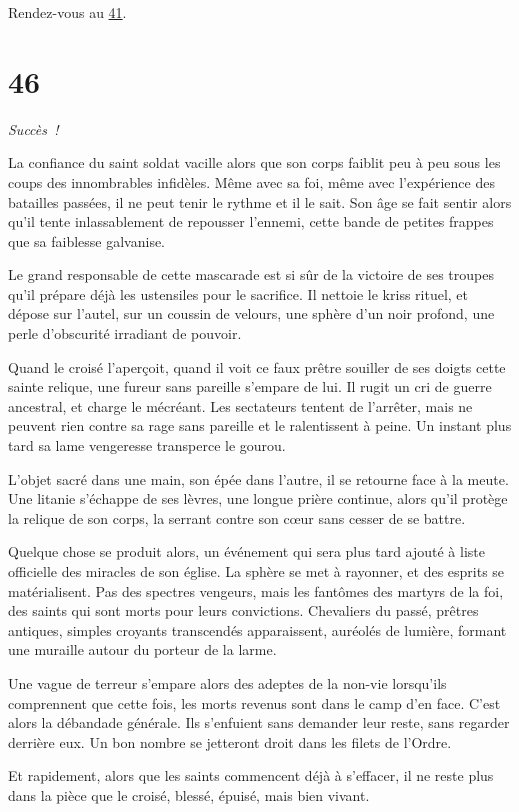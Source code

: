 \documentclass{report}
\newcommand{\gsection}[1]{
    \section{#1}
    \label{section-#1}
}
\newcommand{\glink}[1]{\hyperref[section-#1]{#1}}
\newcommand{\success}{\emph{Succès !}}
\begin{document}
Rendez-vous au \glink{41}.

\gsection{46}

\success

La confiance du saint soldat vacille alors que son corps faiblit peu à peu sous les coups des innombrables infidèles. Même avec sa foi, même avec l'expérience des batailles passées, il ne peut tenir le rythme et il le sait. Son âge se fait sentir alors qu'il tente inlassablement de repousser l'ennemi, cette bande de petites frappes que sa faiblesse galvanise.

Le grand responsable de cette mascarade est si sûr de la victoire de ses troupes qu'il prépare déjà les ustensiles pour le sacrifice. Il nettoie le kriss rituel, et dépose sur l'autel, sur un coussin de velours, une sphère d'un noir profond, une perle d'obscurité irradiant de pouvoir.

Quand le croisé l'aperçoit, quand il voit ce faux prêtre souiller de ses doigts cette sainte relique, une fureur sans pareille s'empare de lui. Il rugit un cri de guerre ancestral, et charge le mécréant. Les sectateurs tentent de l'arrêter, mais ne peuvent rien contre sa rage sans pareille et le ralentissent à peine. Un instant plus tard sa lame vengeresse transperce le gourou.

L'objet sacré dans une main, son épée dans l'autre, il se retourne face à la meute. Une litanie s'échappe de ses lèvres, une longue prière continue, alors qu'il protège la relique de son corps, la serrant contre son cœur sans cesser de se battre.

Quelque chose se produit alors, un événement qui sera plus tard ajouté à liste officielle des miracles de son église. La sphère se met à rayonner, et des esprits se matérialisent. Pas des spectres vengeurs, mais les fantômes des martyrs de la foi, des saints qui sont morts pour leurs convictions. Chevaliers du passé, prêtres antiques, simples croyants transcendés apparaissent, auréolés de lumière, formant une muraille autour du porteur de la larme.

Une vague de terreur s'empare alors des adeptes de la non-vie lorsqu'ils comprennent que cette fois, les morts revenus sont dans le camp d'en face. C'est alors la débandade générale. Ils s'enfuient sans demander leur reste, sans regarder derrière eux. Un bon nombre se jetteront droit dans les filets de l'Ordre.

Et rapidement, alors que les saints commencent déjà à s'effacer, il ne reste plus dans la pièce que le croisé, blessé, épuisé, mais bien vivant.
\end{document}
